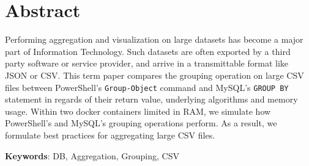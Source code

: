 
\section*{Abstract}
Performing aggregation and visualization on large datasets has become a major part of Information Technology.
Such datasets are often exported by a third party software or service provider, and arrive in a transmittable
format like \gls{JSON} or \gls{CSV}.
This term paper compares the grouping operation on large \gls{CSV} files between PowerShell's
\verb+Group-Object+ command and \gls{MySQL}'s \verb+GROUP BY+ statement in regards of
their return value, underlying algorithms and memory usage. Within two docker containers
limited in \gls{RAM}, we simulate how PowerShell's and MySQL's grouping operations perform. As a result,
we formulate best practices for aggregating large \gls{CSV} files.

\textbf{Keywords}: \gls{DB}, Aggregation, Grouping, \gls{CSV}

\newpage